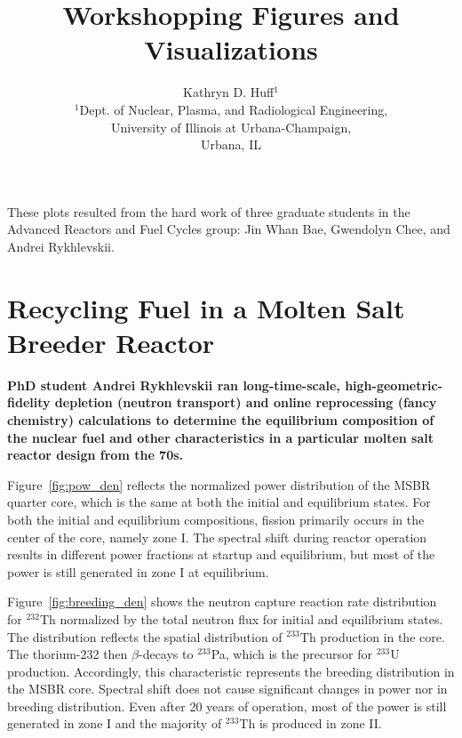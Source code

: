 \documentclass{article}
\begin{document}
\title{Workshopping Figures and Visualizations}
\author{Kathryn D. Huff$^{1}$\\
        $^{1}$Dept. of Nuclear, Plasma, and Radiological Engineering, \\
University of Illinois at Urbana-Champaign, \\
Urbana, IL}

\date{}
\maketitle 
These plots resulted from the hard work of three graduate students in the 
Advanced Reactors and Fuel Cycles group: Jin Whan Bae, Gwendolyn 
Chee, and Andrei Rykhlevskii.

\section*{Recycling Fuel in a Molten Salt Breeder Reactor \cite{rykhlevskii_modeling_2018}}

\textbf{PhD student Andrei Rykhlevskii ran long-time-scale, 
        high-geometric-fidelity  depletion (neutron 
transport) and online reprocessing (fancy chemistry) calculations to determine 
the equilibrium composition of the nuclear fuel and other characteristics in a 
particular molten salt reactor design from the 70s.} 

Figure~\ref{fig:pow_den} reflects the
normalized power distribution of the \gls{MSBR} quarter core, which is the same
at both the initial and equilibrium states. For both the initial and equilibrium compositions, fission
primarily occurs in the center of the core, namely zone I. The spectral shift
during reactor operation results in different power fractions at startup and
equilibrium, but most of the power is still generated in zone I at equilibrium.

Figure~\ref{fig:breeding_den} shows the neutron capture reaction rate
distribution for $^{232}$Th normalized by the total neutron flux for initial
and equilibrium states. The distribution reflects the spatial distribution of
$^{233}$Th production in the core. The thorium-232 then $\beta$-decays to
$^{233}$Pa, which is the precursor for $^{233}$U production. Accordingly, this
characteristic represents the breeding distribution in the \gls{MSBR} core.
Spectral shift does not cause significant changes in power nor in breeding
distribution. Even after 20 years of operation, most of the power is still
generated in zone I and the majority of $^{233}$Th is
produced in zone II.
\end{document}
